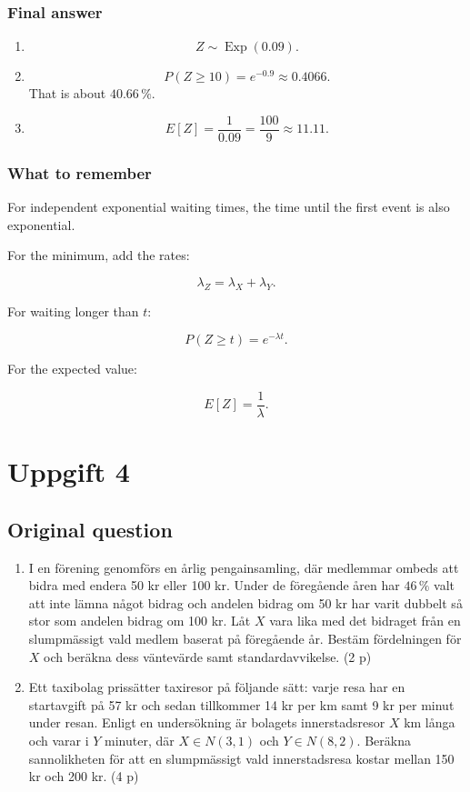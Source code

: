 \documentclass[10pt]{article}
\begin{document}
\subsubsection*{Final answer}
\begin{enumerate}[label=\alph*)]
\item
\[
Z\sim \operatorname{Exp}(0.09).
\]

\item
\[
P(Z\geq 10)=e^{-0.9}\approx 0.4066.
\]
That is about $40.66\,\%$.

\item
\[
E[Z]=\frac{1}{0.09}
=\frac{100}{9}
\approx 11.11.
\]
\end{enumerate}

\subsubsection*{What to remember}
For independent exponential waiting times,
the time until the first event is also exponential.

For the minimum, add the rates:

\[
\lambda_Z=\lambda_X+\lambda_Y.
\]

For waiting longer than $t$:

\[
P(Z\geq t)=e^{-\lambda t}.
\]

For the expected value:

\[
E[Z]=\frac{1}{\lambda}.
\]

\section*{Uppgift 4}

\subsection*{Original question}
\begin{enumerate}[label=\alph*)]
\item
I en förening genomförs en årlig pengainsamling, där medlemmar
ombeds att bidra med endera 50 kr eller 100 kr. Under de föregående
åren har $46\,\%$ valt att inte lämna något bidrag och andelen bidrag
om 50 kr har varit dubbelt så stor som andelen bidrag om 100 kr.
Låt $X$ vara lika med det bidraget från en slumpmässigt vald medlem
baserat på föregående år. Bestäm fördelningen för $X$ och beräkna
dess väntevärde samt standardavvikelse.
\hfill (2 p)

\item
Ett taxibolag prissätter taxiresor på följande sätt: varje resa har
en startavgift på 57 kr och sedan tillkommer 14 kr per km samt
9 kr per minut under resan. Enligt en undersökning är bolagets
innerstadsresor $X$ km långa och varar i $Y$ minuter, där
$X\in N(3,1)$ och $Y\in N(8,2)$. Beräkna sannolikheten för att en
slumpmässigt vald innerstadsresa kostar mellan 150 kr och 200 kr.
\hfill (4 p)
\end{enumerate}
\end{document}
